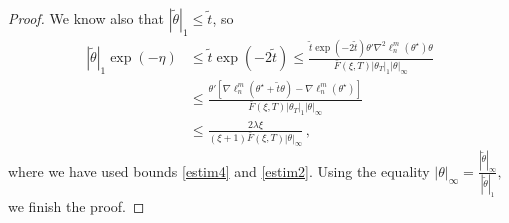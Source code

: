 \documentclass[twoside,11pt]{article}
\def\llnm{\ell_n^m}
\def\th{\theta}
\def\tth{\tilde{\theta}}
\def\ths{\th^\star}
\def\grad{\nabla}
\def\hess{\nabla^2}
\def\bef{\bar{F}(\xi,T)}
\begin{document}
\begin{proof}
We know also that $|\tth|_1 \leq \tilde{t}$, so 
\begin{align*}
|\tth|_1 \exp(-\eta) &\leq \tilde{t} \exp(-2\tilde{t}) \leq
 \frac{\tilde{t} \exp(-2\tilde{t}) \th ' \hess \llnm(\ths) \th}{ \bef |\th _T|_1 |\th|_\infty} \\
 &\leq\frac{\th '  \left[ \grad \llnm(\ths + \tilde{t} \th) -  \grad \llnm(\ths)
\right]}{ \bef |\th _T|_1 |\th|_\infty} \\
&\leq   \frac{2 \lambda \xi}{(\xi +1) \bef |\th|_\infty}\, ,
\end{align*}
where we have used bounds \eqref{estim4} and \eqref{estim2}. Using the equality 
$|\th|_\infty = \frac{|\tth|_\infty}{|\tth|_1},$ we finish the proof.
\end{proof}
\end{document}
